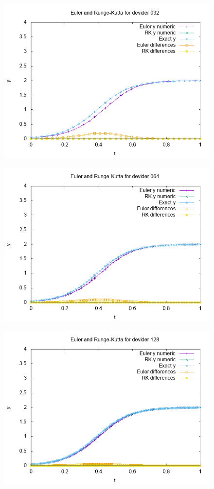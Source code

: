\documentclass[a4paper,10pt]{article}
\begin{document}
	\begin{figure}[h!]
		\centering
		\includegraphics[width=0.7\linewidth]{plot032}
		\caption{}
		\label{fig:plot032}
	\end{figure}
	\begin{figure}[h!]
		\centering
		\includegraphics[width=0.7\linewidth]{plot064}
		\caption{}
		\label{fig:plot064}
	\end{figure}
	\begin{figure}[h!]
		\centering
		\includegraphics[width=0.7\linewidth]{plot128}
		\caption{}
		\label{fig:plot128}
	\end{figure}
	
\end{document}
